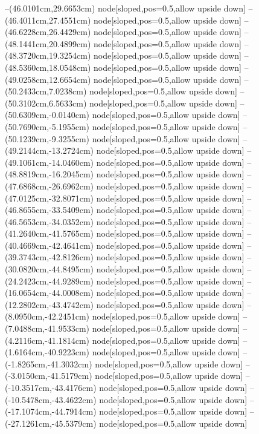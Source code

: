 --(46.0101cm,29.6653cm) node[sloped,pos=0.5,allow upside down]{\ArrowIn}
--(46.4011cm,27.4551cm) node[sloped,pos=0.5,allow upside down]{\ArrowIn}
--(46.6228cm,26.4429cm) node[sloped,pos=0.5,allow upside down]{\ArrowIn}
--(48.1441cm,20.4899cm) node[sloped,pos=0.5,allow upside down]{\ArrowIn}
--(48.3720cm,19.3254cm) node[sloped,pos=0.5,allow upside down]{\ArrowIn}
--(48.5360cm,18.0548cm) node[sloped,pos=0.5,allow upside down]{\ArrowIn}
--(49.0258cm,12.6654cm) node[sloped,pos=0.5,allow upside down]{\ArrowIn}
--(50.2433cm,7.0238cm) node[sloped,pos=0.5,allow upside down]{\ArrowIn}
--(50.3102cm,6.5633cm) node[sloped,pos=0.5,allow upside down]{\arrowIn}
--(50.6309cm,-0.0140cm) node[sloped,pos=0.5,allow upside down]{\ArrowIn}
--(50.7690cm,-5.1955cm) node[sloped,pos=0.5,allow upside down]{\ArrowIn}
--(50.1239cm,-9.3255cm) node[sloped,pos=0.5,allow upside down]{\ArrowIn}
--(49.2144cm,-13.2724cm) node[sloped,pos=0.5,allow upside down]{\ArrowIn}
--(49.1061cm,-14.0460cm) node[sloped,pos=0.5,allow upside down]{\arrowIn}
--(48.8819cm,-16.2045cm) node[sloped,pos=0.5,allow upside down]{\ArrowIn}
--(47.6868cm,-26.6962cm) node[sloped,pos=0.5,allow upside down]{\ArrowIn}
--(47.0125cm,-32.8071cm) node[sloped,pos=0.5,allow upside down]{\ArrowIn}
--(46.8655cm,-33.5409cm) node[sloped,pos=0.5,allow upside down]{\arrowIn}
--(46.5653cm,-34.0352cm) node[sloped,pos=0.5,allow upside down]{\arrowIn}
--(41.2640cm,-41.5765cm) node[sloped,pos=0.5,allow upside down]{\ArrowIn}
--(40.4669cm,-42.4641cm) node[sloped,pos=0.5,allow upside down]{\ArrowIn}
--(39.3743cm,-42.8126cm) node[sloped,pos=0.5,allow upside down]{\ArrowIn}
--(30.0820cm,-44.8495cm) node[sloped,pos=0.5,allow upside down]{\ArrowIn}
--(24.2423cm,-44.9289cm) node[sloped,pos=0.5,allow upside down]{\ArrowIn}
--(16.0654cm,-44.0008cm) node[sloped,pos=0.5,allow upside down]{\ArrowIn}
--(12.2802cm,-43.4742cm) node[sloped,pos=0.5,allow upside down]{\ArrowIn}
--(8.0950cm,-42.2451cm) node[sloped,pos=0.5,allow upside down]{\ArrowIn}
--(7.0488cm,-41.9533cm) node[sloped,pos=0.5,allow upside down]{\ArrowIn}
--(4.2116cm,-41.1814cm) node[sloped,pos=0.5,allow upside down]{\ArrowIn}
--(1.6164cm,-40.9223cm) node[sloped,pos=0.5,allow upside down]{\ArrowIn}
--(-1.8265cm,-41.3032cm) node[sloped,pos=0.5,allow upside down]{\ArrowIn}
--(-3.0150cm,-41.5179cm) node[sloped,pos=0.5,allow upside down]{\ArrowIn}
--(-10.3517cm,-43.4176cm) node[sloped,pos=0.5,allow upside down]{\ArrowIn}
--(-10.5478cm,-43.4622cm) node[sloped,pos=0.5,allow upside down]{\arrowIn}
--(-17.1074cm,-44.7914cm) node[sloped,pos=0.5,allow upside down]{\ArrowIn}
--(-27.1261cm,-45.5379cm) node[sloped,pos=0.5,allow upside down]{\ArrowIn}
